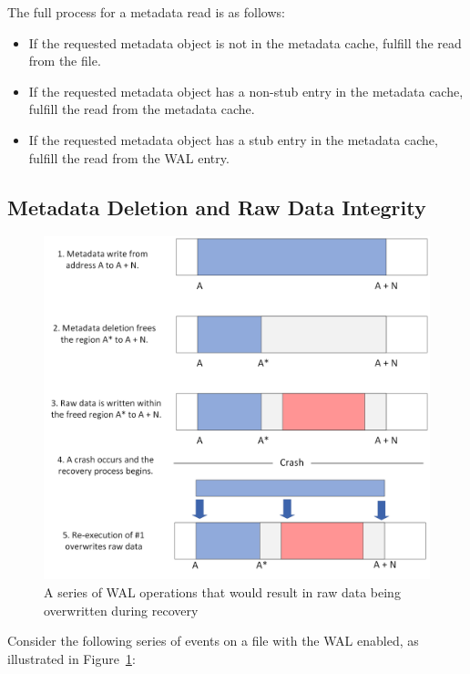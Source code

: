 The full process for a metadata read is as follows:
\begin{itemize}
    \item If the requested metadata object is not in the metadata cache, fulfill the read from the file.

    \item If the requested metadata object has a non-stub entry in the metadata cache, fulfill the read from the metadata cache.

    \item If the requested metadata object has a stub entry in the metadata cache, fulfill the read from the WAL entry. 
\end{itemize}

\subsection{Metadata Deletion and Raw Data Integrity}
\label{sec:Metadata-Deletion}

\begin{figure}
    \centering
    \includegraphics[width=1.0\textwidth]{images/wal_md_delete_diagram.png}
    \caption{A series of WAL operations that would result in raw data being overwritten during recovery}
    \label{fig:wal-md-delete-diagram}
\end{figure}

Consider the following series of events on a file with the WAL enabled, as illustrated in Figure~\ref{fig:wal-md-delete-diagram}:

